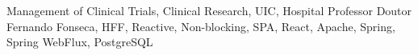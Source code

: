 




\begin{keywords}
Management of Clinical Trials, Clinical Research, UIC, Hospital Professor Doutor Fernando Fonseca, HFF, Reactive, Non-blocking, SPA, React, Apache, Spring, Spring WebFlux, PostgreSQL
\end{keywords} 
